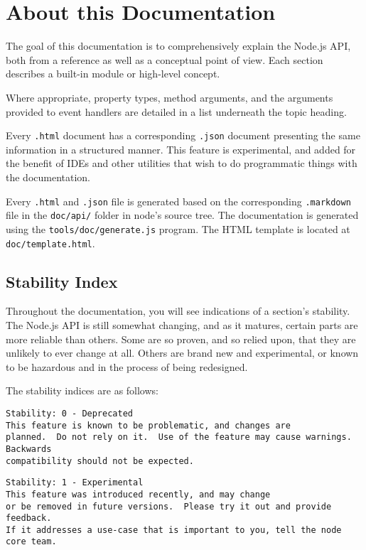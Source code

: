 \section{About this Documentation}

The goal of this documentation is to comprehensively explain the Node.js
API, both from a reference as well as a conceptual point of view. Each
section describes a built-in module or high-level concept.

Where appropriate, property types, method arguments, and the arguments
provided to event handlers are detailed in a list underneath the topic
heading.

Every \texttt{.html} document has a corresponding \texttt{.json}
document presenting the same information in a structured manner. This
feature is experimental, and added for the benefit of IDEs and other
utilities that wish to do programmatic things with the documentation.

Every \texttt{.html} and \texttt{.json} file is generated based on the
corresponding \texttt{.markdown} file in the \texttt{doc/api/} folder in
node's source tree. The documentation is generated using the
\texttt{tools/doc/generate.js} program. The HTML template is located at
\texttt{doc/template.html}.

\subsection{Stability Index}

Throughout the documentation, you will see indications of a section's
stability. The Node.js API is still somewhat changing, and as it
matures, certain parts are more reliable than others. Some are so
proven, and so relied upon, that they are unlikely to ever change at
all. Others are brand new and experimental, or known to be hazardous and
in the process of being redesigned.

The stability indices are as follows:

\begin{verbatim}
Stability: 0 - Deprecated
This feature is known to be problematic, and changes are
planned.  Do not rely on it.  Use of the feature may cause warnings.  Backwards
compatibility should not be expected.
\end{verbatim}

\begin{verbatim}
Stability: 1 - Experimental
This feature was introduced recently, and may change
or be removed in future versions.  Please try it out and provide feedback.
If it addresses a use-case that is important to you, tell the node core team.
\end{verbatim}

